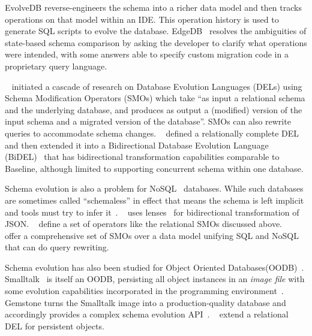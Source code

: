 \documentclass[english,submission]{programming}
\theoremstyle{definition}
\newcommand{\citet}[1]{\citeauthor*{#1}~\cite{#1}}
\begin{document}
EvolveDB\cite{evolvedb} reverse-engineers the schema into a richer data model and then tracks operations on that model within an IDE. This operation history is used to generate SQL scripts to evolve the database. EdgeDB~\cite{edgedb} resolves the ambiguities of state-based schema comparison by asking the developer to clarify what operations were intended, with some answers able to specify custom migration code in a proprietary query language.

\citet{curino08} initiated a cascade of research on Database Evolution Languages (DELs) using Schema Modification Operators (SMOs) which take
 ``as input a relational schema and the underlying database, and produces as output a (modified) version of the input schema and a migrated version of the database''. SMOs can also rewrite queries to accommodate schema changes.
 \citet{herrmann15} defined a relationally complete DEL and then extended it into a Bidirectional Database Evolution Language (BiDEL)~\cite{herrmann17} that has bidirectional transformation capabilities comparable to Baseline, although limited to supporting concurrent schema within one database.

Schema evolution is also a problem for NoSQL~\cite{sadalage12} databases. While such databases are sometimes called ``schemaless'' in effect that means the schema is left implicit and tools must try to infer it~\cite{storl20, storl22}. \citet{Cambria} uses lenses~\cite{Foster2007} for bidirectional transformation of JSON. \citet{scherzinger13} define a set of operators like the relational SMOs discussed above. \citeauthor*{chillon22}~\cite{chillon22, chillon23} offer a comprehensive set of SMOs over a data model unifying SQL and NoSQL that can do query rewriting.

Schema evolution has also been studied for Object Oriented Databases(OODB)~\cite{li99, banerjee87}. Smalltalk~\cite{Goldberg80} is itself an OODB, persisting all object instances in an \textit{image file} with some evolution capabilities incorporated in the programming environment~\cite[pp.252-272]{Goldberg80}. Gemstone turns the Smalltalk image into a production-quality database and accordingly provides a complex schema evolution API~\cite{Gemstone}. \citet{kamina25} extend a relational DEL for persistent objects.
\end{document}

